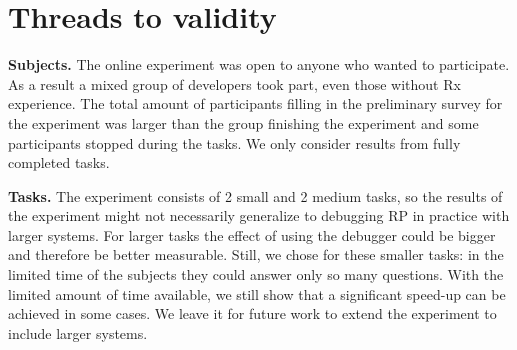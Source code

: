 \section{Threads to validity}


\textbf{Subjects.} The online experiment was open to anyone who wanted to participate. As a result a mixed group of developers took part, even those without Rx experience. The total amount of participants filling in the preliminary survey for the experiment was larger than the group finishing the experiment and some participants stopped during the tasks. We only consider results from fully completed tasks.

\textbf{Tasks.} The experiment consists of 2 small and 2 medium tasks, so the results of the experiment might not necessarily generalize to debugging RP in practice with larger systems. For larger tasks the effect of using the debugger could be bigger and therefore be better measurable. Still, we chose for these smaller tasks: in the limited time of the subjects they could answer only so many questions. With the limited amount of time available, we still show that a significant speed-up can be achieved in some cases. We leave it for future work to extend the experiment to include larger systems.
